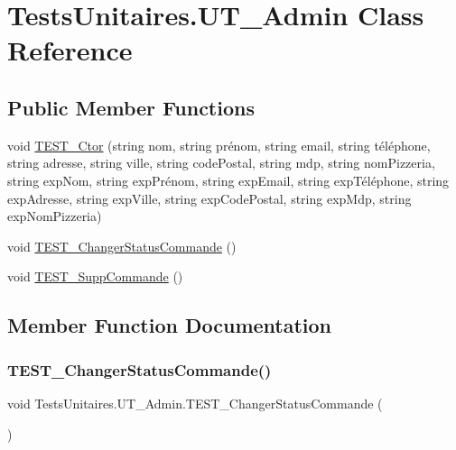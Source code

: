 \hypertarget{classTestsUnitaires_1_1UT__Admin}{}\section{Tests\+Unitaires.\+U\+T\+\_\+\+Admin Class Reference}
\label{classTestsUnitaires_1_1UT__Admin}
\subsection*{Public Member Functions}
\begin{DoxyCompactItemize}
\item 
void \hyperlink{classTestsUnitaires_1_1UT__Admin_a7e94b79a39fafc558fd8cb7f60b9be48}{T\+E\+S\+T\+\_\+\+Ctor} (string nom, string prénom, string email, string téléphone, string adresse, string ville, string code\+Postal, string mdp, string nom\+Pizzeria, string exp\+Nom, string exp\+Prénom, string exp\+Email, string exp\+Téléphone, string exp\+Adresse, string exp\+Ville, string exp\+Code\+Postal, string exp\+Mdp, string exp\+Nom\+Pizzeria)
\item 
void \hyperlink{classTestsUnitaires_1_1UT__Admin_ac2bcc48c4136858ee431a95cc0b63e37}{T\+E\+S\+T\+\_\+\+Changer\+Status\+Commande} ()
\item 
void \hyperlink{classTestsUnitaires_1_1UT__Admin_aa22f22b624760467abb5fd441c1ece3e}{T\+E\+S\+T\+\_\+\+Supp\+Commande} ()
\end{DoxyCompactItemize}


\subsection{Member Function Documentation}
\mbox{\label{classTestsUnitaires_1_1UT__Admin_ac2bcc48c4136858ee431a95cc0b63e37}} 
\subsubsection{\texorpdfstring{T\+E\+S\+T\+\_\+\+Changer\+Status\+Commande()}{TEST\_ChangerStatusCommande()}}
{\footnotesize\ttfamily void Tests\+Unitaires.\+U\+T\+\_\+\+Admin.\+T\+E\+S\+T\+\_\+\+Changer\+Status\+Commande (\begin{DoxyParamCaption}{ }\end{DoxyParamCaption})\hspace{0.3cm}{\ttfamily [inline]}}


